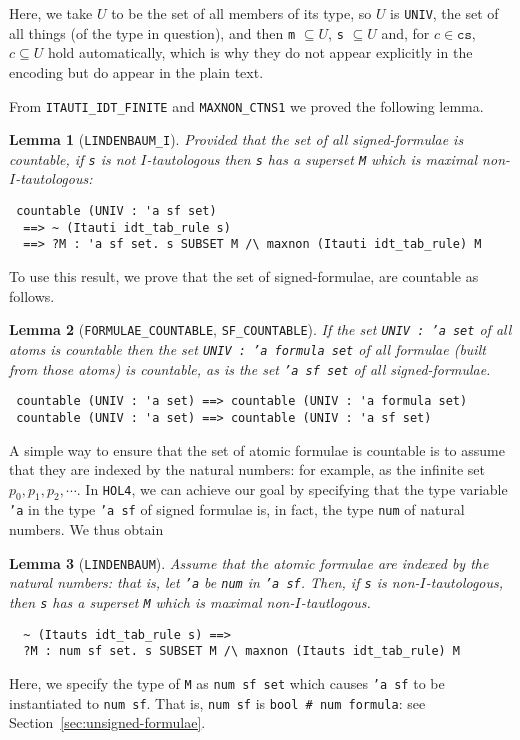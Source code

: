 \documentclass[a4paper]{article}
\newtheorem{lemma}{Lemma}
\newcommand{\hol}{\texttt{HOL4}}
\begin{document}
Here, we take $U$ to be the set of all
members of its type, so $U$ is \texttt{UNIV}, the set of all things
(of the type in question), and then
\texttt{m} $\subseteq U$, \texttt{s} $\subseteq U$ and,
for $c \in \texttt{cs}$, $c \subseteq U$ hold automatically, which is
why they do not appear explicitly in the encoding but do appear in the
plain text.

From \texttt{ITAUTI\_IDT\_FINITE} and \texttt{MAXNON\_CTNS1} we proved
the following lemma.
\begin{lemma}[\texttt{LINDENBAUM\_I}]\label{LINDENBAUM-I}
  Provided that the set of all signed-formulae is countable, 
  if \texttt{s} is not $I$-tautologous then \texttt{s} has a superset 
\texttt{M} which is maximal non-$I$-tautologous:
\end{lemma}
\begin{verbatim}
 countable (UNIV : 'a sf set) 
  ==> ~ (Itauti idt_tab_rule s) 
  ==> ?M : 'a sf set. s SUBSET M /\ maxnon (Itauti idt_tab_rule) M
\end{verbatim}

To use this result, we prove that
the set of signed-formulae, are countable as follows.
\begin{lemma}[\texttt{FORMULAE\_COUNTABLE}, \texttt{SF\_COUNTABLE}]
\label{FORMULAE-COUNTABLE}
\label{SF-COUNTABLE}
If the set \texttt{UNIV : 'a set} of all atoms is countable then the set
\texttt{UNIV : 'a formula set} of all formulae (built from
those atoms) is countable, as is the set
\texttt{'a sf set} of all signed-formulae.
\end{lemma}
\begin{verbatim}
 countable (UNIV : 'a set) ==> countable (UNIV : 'a formula set)
 countable (UNIV : 'a set) ==> countable (UNIV : 'a sf set)
\end{verbatim}

A simple way to ensure that the set of atomic formulae is countable is
to assume that they are indexed by the natural numbers: for example,
as the infinite set $p_0, p_1, p_2, \cdots$. In \hol{}, we can achieve
our goal by specifying that the type variable \texttt{'a} in the type
\texttt{'a sf} of signed formulae is, in fact, the type \texttt{num}
of natural numbers. 
We thus obtain %

\begin{lemma}[\texttt{LINDENBAUM}]\label{LINDENBAUM}
  Assume that the atomic formulae are indexed by the natural numbers:
  that is, let \texttt{'a} be \texttt{num} in \texttt{'a sf}.
  Then, if \texttt{s} is non-$I$-tautologous, then \texttt{s}
  has a superset \texttt{M} which is maximal non-$I$-tautlogous.
\end{lemma}
\begin{verbatim}
  ~ (Itauts idt_tab_rule s) ==>
  ?M : num sf set. s SUBSET M /\ maxnon (Itauts idt_tab_rule) M
\end{verbatim}
Here, we specify the type of \texttt{M} as \texttt{num sf set}
which causes \texttt{'a sf} to be instantiated to \texttt{num sf}.
That is, \texttt{num sf} is \texttt{bool \# num formula}: see
Section~\ref{sec:unsigned-formulae}.
\end{document}
